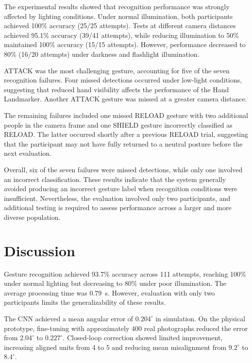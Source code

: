 \documentclass[lettersize,journal]{IEEEtran}
\begin{document}
	The experimental results showed
	that recognition performance was strongly affected by lighting
	conditions. Under normal illumination, both participants
	achieved 100\% accuracy (25/25 attempts). Tests at different
	camera distances achieved 95.1\% accuracy (39/41 attempts),
	while reducing illumination to 50\% maintained 100\%
	accuracy (15/15 attempts). However, performance decreased
	to 80\% (16/20 attempts) under darkness and flashlight
	illumination.

	ATTACK was the most challenging
	gesture, accounting for five of the seven recognition
	failures. Four missed detections occurred under low-light
	conditions, suggesting that reduced hand visibility affects
	the performance of the Hand Landmarker. Another ATTACK
	gesture was missed at a greater camera distance.

	The remaining failures included
	one missed RELOAD gesture with two additional people in
	the camera frame and one SHIELD gesture incorrectly
	classified as RELOAD. The latter occurred shortly after
	a previous RELOAD trial, suggesting that the participant
	may not have fully returned to a neutral posture before
	the next evaluation.

	Overall, six of the seven
	failures were missed detections, while only one involved
	an incorrect classification. These results indicate that
	the system generally avoided producing an incorrect
	gesture label when recognition conditions were insufficient.
	Nevertheless, the evaluation involved only two participants,
	and additional testing is required to assess performance
	across a larger and more diverse population.

		
	
	\section{Discussion}
	\label{sec:discussion}
	
	Gesture recognition achieved 93.7\% accuracy
	across 111 attempts, reaching 100\% under
	normal lighting but decreasing to 80\%
	under poor illumination. The average
	processing time was 0.79~s. However,
	evaluation with only two participants
	limits the generalizability of these results.
	
	The CNN achieved a mean angular error of
	$0.204^\circ$ in simulation. On the physical
	prototype, fine-tuning with approximately
	400 real photographs reduced the error
	from $2.04^\circ$ to $0.227^\circ$.
	Closed-loop correction showed limited
	improvement, increasing aligned units
	from 4 to 5 and reducing mean misalignment
	from $9.2^\circ$ to $8.4^\circ$.
	
\end{document}
